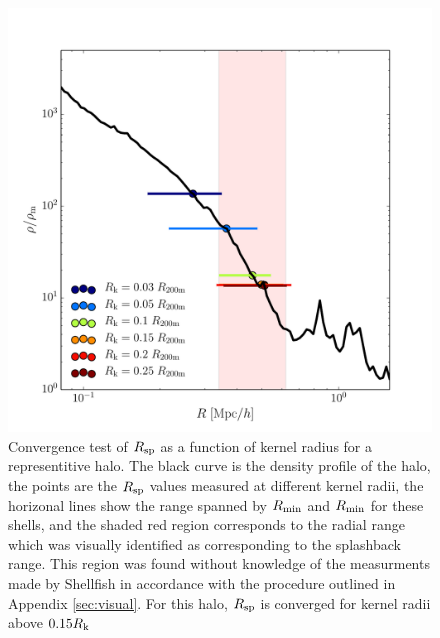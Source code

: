 \documentclass[numberedappendix,apj]{emulateapj}
\begin{document}
\begin{figure}
   \centering
   \includegraphics[width=\columnwidth]{rk_convergence_prof.pdf}
   \caption{Convergence test of $R_{\rm sp}$ as a function of kernel radius for
      a representitive halo. The black curve is the density profile of the halo,
      the points are the $R_{\rm sp}$ values measured at different kernel radii,
      the horizonal lines show the range spanned by $R_{\rm min}$ and
      $R_{\rm min}$ for these shells, and the shaded red region corresponds to
      the radial range which was visually identified as corresponding to the
      splashback range. This region was found without knowledge of the
      measurments made by Shellfish in accordance with the procedure outlined
      in Appendix \ref{sec:visual}. For this halo, $R_{\rm sp}$ is converged
      for kernel radii above $0.15R_{\rm k}$
   }
        \label{fig:rk_convergence_prof}
\end{figure}
\end{document}
